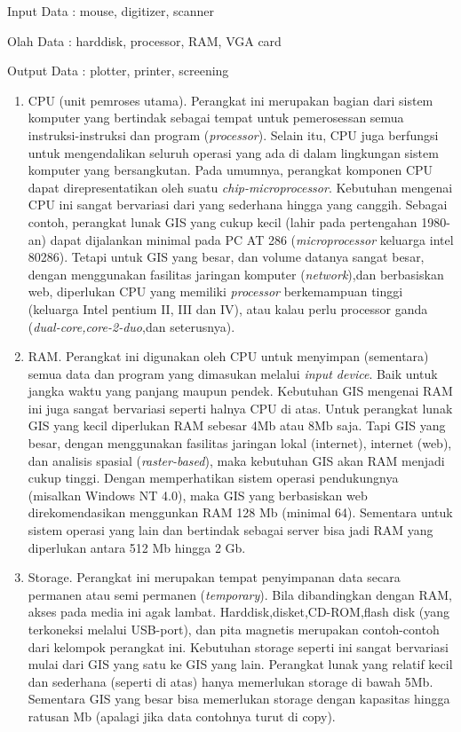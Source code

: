  Input Data	 : mouse, digitizer, scanner

 Olah Data 	 : harddisk, processor, RAM, VGA card

 Output Data : plotter, printer, screening
\begin{enumerate}
\item CPU (unit pemroses utama). Perangkat ini merupakan bagian dari sistem komputer yang bertindak sebagai tempat untuk pemerosessan semua instruksi-instruksi dan program (\textit{processor}). Selain itu, CPU juga berfungsi untuk mengendalikan seluruh operasi yang ada di dalam lingkungan sistem komputer yang bersangkutan. Pada umumnya, perangkat komponen CPU dapat direpresentatikan oleh suatu \textit{chip-microprocessor}. Kebutuhan mengenai CPU ini sangat bervariasi dari yang sederhana hingga yang canggih. Sebagai contoh, perangkat lunak GIS yang cukup kecil (lahir pada pertengahan 1980-an) dapat dijalankan minimal pada PC AT 286 (\textit{microprocessor} keluarga intel 80286). Tetapi untuk GIS yang besar, dan volume datanya sangat besar, dengan menggunakan fasilitas jaringan komputer (\textit{network}),dan berbasiskan web, diperlukan CPU yang memiliki \textit{processor} berkemampuan tinggi (keluarga Intel pentium II, III dan IV), atau kalau perlu processor ganda (\textit{dual-core,core-2-duo},dan seterusnya).
\item RAM. Perangkat ini digunakan oleh CPU untuk menyimpan (sementara) semua data dan program yang dimasukan melalui \textit{input device}. Baik untuk jangka waktu yang panjang maupun pendek. Kebutuhan GIS mengenai RAM ini juga sangat bervariasi seperti halnya CPU di atas. Untuk perangkat lunak GIS yang kecil diperlukan RAM sebesar 4Mb atau 8Mb saja. Tapi GIS yang besar, dengan menggunakan fasilitas jaringan lokal (internet), internet (web), dan analisis spasial (\textit{raster-based}), maka kebutuhan GIS akan RAM menjadi cukup tinggi. Dengan memperhatikan sistem operasi pendukungnya (misalkan Windows NT 4.0), maka GIS yang berbasiskan web direkomendasikan menggunkan RAM 128 Mb (minimal 64). Sementara untuk sistem operasi yang lain dan bertindak sebagai server bisa jadi RAM yang diperlukan antara 512 Mb hingga 2 Gb. 
\item Storage. Perangkat ini merupakan tempat penyimpanan data secara permanen atau semi permanen (\textit{temporary}). Bila dibandingkan dengan RAM, akses pada media ini agak lambat. Harddisk,disket,CD-ROM,flash disk (yang terkoneksi melalui USB-port), dan pita magnetis merupakan contoh-contoh dari kelompok perangkat ini. Kebutuhan storage seperti ini sangat bervariasi mulai dari GIS yang satu ke GIS yang lain. Perangkat lunak yang relatif kecil dan sederhana (seperti di atas) hanya memerlukan storage di bawah 5Mb. Sementara GIS yang besar bisa memerlukan storage dengan kapasitas hingga ratusan Mb (apalagi jika data contohnya turut di copy).

\end{enumerate}
